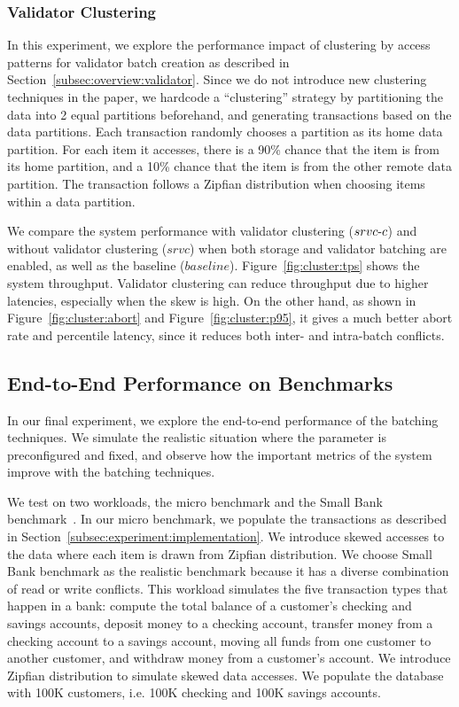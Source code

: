 \subsubsection{Validator Clustering}
In this experiment, we explore the performance impact of clustering by access patterns for validator batch creation as described in Section~\ref{subsec:overview:validator}. Since we do not introduce new clustering techniques in the paper, we hardcode a ``clustering'' strategy by partitioning the data into 2 equal partitions beforehand, and generating transactions based on the data partitions. Each transaction randomly chooses a partition as its home data partition. For each item it accesses, there is a 90\% chance that the item is from its home partition, and a 10\% chance that the item is from the other remote data partition. The transaction follows a Zipfian distribution when choosing items within a data partition.

We compare the system performance with validator clustering ($srvc\hbox{-}c$) and without validator clustering ($srvc$) when both storage and validator batching are enabled, as well as the baseline ($baseline$). Figure~\ref{fig:cluster:tps} shows the system throughput. Validator clustering can reduce throughput due to higher latencies, especially when the skew is high. On the other hand, as shown in Figure~\ref{fig:cluster:abort} and Figure~\ref{fig:cluster:p95}, it gives a much better abort rate and percentile latency, since it reduces both inter- and intra-batch conflicts. 

\subsection{End-to-End Performance on Benchmarks}
\label{subsec:experiment:end2end}
In our final experiment, we explore the end-to-end performance of the batching techniques. We simulate the realistic situation where the parameter is preconfigured and fixed, and observe how the important metrics of the system improve with the batching techniques.

We test on two workloads, the micro benchmark and the Small Bank benchmark~\cite{alomari2008icde}. In our micro benchmark,  we populate the transactions as described in Section~\ref{subsec:experiment:implementation}. We introduce skewed accesses to the data where each item is drawn from Zipfian distribution. We choose Small Bank benchmark as the realistic benchmark because it has a diverse combination of read or write conflicts. This workload simulates the five transaction types that happen in a bank: compute the total balance of a customer's checking and savings accounts, deposit money to a checking account, transfer money from a checking account to a savings account, moving all funds from one customer to another customer, and withdraw money from a customer's account. We introduce Zipfian distribution to simulate skewed data accesses. We populate the database with 100K customers, i.e. 100K checking and 100K savings accounts.

